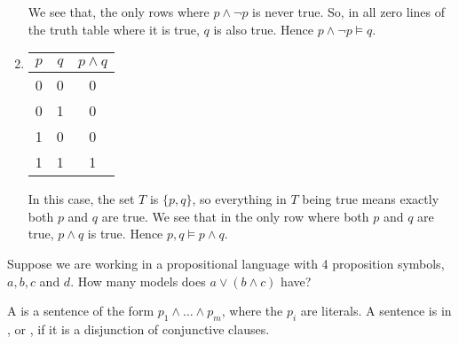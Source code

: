 \documentclass[11pt]{article}
\begin{document}
\begin{answer}
\begin{enumerate}
\begin{minipage}{0.5\textwidth}
            We see that, the only rows where $p \land \neg p$ is never true. So, in all zero lines of the truth table where it is true, $q$ is also true. Hence $p \land \neg p \vDash q$.
        \end{minipage}
        \item 
        \begin{tabular}{|c|c|c|}
            \hline
            \cellcolor{blue!40}$p$ & \cellcolor{blue!40}$q$ & \cellcolor{yellow!40}$p \land q$\\
            \hline \hline
            0 & 0 & 0 \\
            0 & 1 & 0 \\
            1 & 0 & 0 \\
            \rowcolor{green!40}1 & 1 & 1 \\
            \hline
        \end{tabular} 
        \quad 
        \begin{minipage}{0.5\textwidth}
            In this case, the set $T$ is $\{p,q\}$, so everything in $T$ being true means exactly both $p$ and $q$ are true. We see that in the only row where both $p$ and $q$ are true, $p \land q$ is true. Hence $p,q \vDash p \land q$.
        \end{minipage}
    \end{enumerate}
\end{answer}
\pagebreak
\begin{question}
    Suppose we are working in a propositional language with 4 proposition symbols, $a,b,c$ and $d$. How many models does $a \lor (b \land c)$ have?
\end{question}
\begin{defi}
    A  is a sentence of the form $p_1 \land \dots \land p_m$, where the $p_i$ are literals.
    \mypar A sentence is in , or , if it is a disjunction of conjunctive clauses.
\end{defi}
\end{document}
